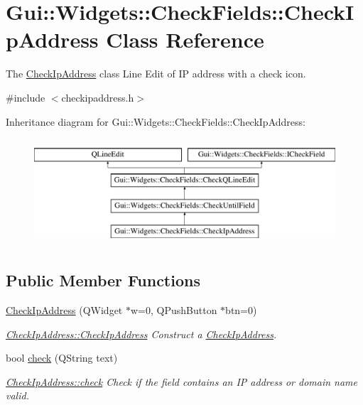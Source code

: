 \hypertarget{classGui_1_1Widgets_1_1CheckFields_1_1CheckIpAddress}{\section{Gui\-:\-:Widgets\-:\-:Check\-Fields\-:\-:Check\-Ip\-Address Class Reference}
\label{classGui_1_1Widgets_1_1CheckFields_1_1CheckIpAddress}
}


The \hyperlink{classGui_1_1Widgets_1_1CheckFields_1_1CheckIpAddress}{Check\-Ip\-Address} class Line Edit of I\-P address with a check icon.  




{\ttfamily \#include $<$checkipaddress.\-h$>$}

Inheritance diagram for Gui\-:\-:Widgets\-:\-:Check\-Fields\-:\-:Check\-Ip\-Address\-:\begin{figure}[H]
\begin{center}
\leavevmode
\includegraphics[height=4.000000cm]{db/d70/classGui_1_1Widgets_1_1CheckFields_1_1CheckIpAddress}
\end{center}
\end{figure}
\subsection*{Public Member Functions}
\begin{DoxyCompactItemize}
\item 
\hyperlink{classGui_1_1Widgets_1_1CheckFields_1_1CheckIpAddress_a0ea8ece5cd108b1ac372e4753a36377e}{Check\-Ip\-Address} (Q\-Widget $\ast$w=0, Q\-Push\-Button $\ast$btn=0)
\begin{DoxyCompactList}\small\item\em \hyperlink{classGui_1_1Widgets_1_1CheckFields_1_1CheckIpAddress_a0ea8ece5cd108b1ac372e4753a36377e}{Check\-Ip\-Address\-::\-Check\-Ip\-Address} Construct a \hyperlink{classGui_1_1Widgets_1_1CheckFields_1_1CheckIpAddress}{Check\-Ip\-Address}. \end{DoxyCompactList}\item 
bool \hyperlink{classGui_1_1Widgets_1_1CheckFields_1_1CheckIpAddress_a785f3ccf0fba4db3e83bfaaaea37455e}{check} (Q\-String text)
\begin{DoxyCompactList}\small\item\em \hyperlink{classGui_1_1Widgets_1_1CheckFields_1_1CheckIpAddress_a785f3ccf0fba4db3e83bfaaaea37455e}{Check\-Ip\-Address\-::check} Check if the field contains an I\-P address or domain name valid. \end{DoxyCompactList}\end{DoxyCompactItemize}
